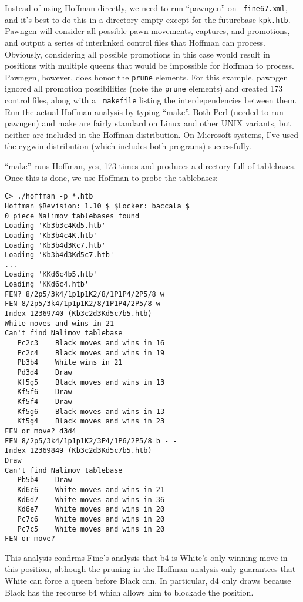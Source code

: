 \documentclass[11pt]{article}
\begin{document}
Instead of using Hoffman directly, we need to run ``pawngen'' on {\tt
fine67.xml}, and it's best to do this in a directory empty except for
the futurebase {\tt kpk.htb}.  Pawngen will consider all possible pawn
movements, captures, and promotions, and output a series of
interlinked control files that Hoffman can process.  Obviously,
considering all possible promotions in this case would result in
positions with multiple queens that would be impossible for Hoffman to
process.  Pawngen, however, does honor the {\tt prune} elements.  For
this example, pawngen ignored all promotion possibilities (note the
{\tt prune} elements) and created 173 control files, along with a {\tt
makefile} listing the interdependencies between them.  Run the actual
Hoffman analysis by typing ``make''.  Both Perl (needed to run
pawngen) and make are fairly standard on Linux and other UNIX
variants, but neither are included in the Hoffman distribution.  On
Microsoft systems, I've used the cygwin distribution (which includes
both programs) successfully.

``make'' runs Hoffman, yes, 173 times and produces a directory full of
tablebases.  Once this is done, we use Hoffman to probe the tablebases:

\begin{verbatim}
C> ./hoffman -p *.htb
Hoffman $Revision: 1.10 $ $Locker: baccala $
0 piece Nalimov tablebases found
Loading 'Kb3b3c4Kd5.htb'
Loading 'Kb3b4c4K.htb'
Loading 'Kb3b4d3Kc7.htb'
Loading 'Kb3b4d3Kd5c7.htb'
...
Loading 'KKd6c4b5.htb'
Loading 'KKd6c4.htb'
FEN? 8/2p5/3k4/1p1p1K2/8/1P1P4/2P5/8 w
FEN 8/2p5/3k4/1p1p1K2/8/1P1P4/2P5/8 w - -
Index 12369740 (Kb3c2d3Kd5c7b5.htb)
White moves and wins in 21
Can't find Nalimov tablebase
   Pc2c3    Black moves and wins in 16
   Pc2c4    Black moves and wins in 19
   Pb3b4    White wins in 21
   Pd3d4    Draw
   Kf5g5    Black moves and wins in 13
   Kf5f6    Draw
   Kf5f4    Draw
   Kf5g6    Black moves and wins in 13
   Kf5g4    Black moves and wins in 23
FEN or move? d3d4
FEN 8/2p5/3k4/1p1p1K2/3P4/1P6/2P5/8 b - -
Index 12369849 (Kb3c2d3Kd5c7b5.htb)
Draw
Can't find Nalimov tablebase
   Pb5b4    Draw
   Kd6c6    White moves and wins in 21
   Kd6d7    White moves and wins in 36
   Kd6e7    White moves and wins in 20
   Pc7c6    White moves and wins in 20
   Pc7c5    White moves and wins in 20
FEN or move?
\end{verbatim}

This analysis confirms Fine's analysis that b4 is White's only winning
move in this position, although the pruning in the Hoffman analysis
only guarantees that White can force a queen before Black can.  In
particular, d4 only draws because Black has the recourse b4 which
allows him to blockade the position.
\end{document}
